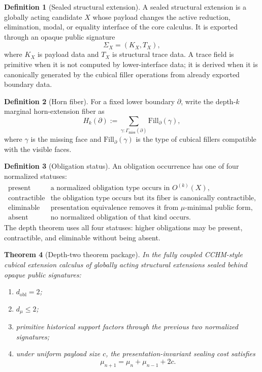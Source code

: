 \documentclass[11pt]{article}
\theoremstyle{plain}
\newtheorem{theorem}{Theorem}[section]
\theoremstyle{definition}
\newtheorem{definition}[theorem]{Definition}
\theoremstyle{remark}
\begin{document}
\begin{definition}[Sealed structural extension]
A sealed structural extension is a globally acting candidate \(X\) whose payload changes the active reduction, elimination, modal, or equality interface of the core calculus. It is exported through an opaque public signature
\[
\Sigma_X=(K_X,T_X),
\]
where \(K_X\) is payload data and \(T_X\) is structural trace data. A trace field is primitive when it is not computed by lower-interface data; it is derived when it is canonically generated by the cubical filler operations from already exported boundary data.
\end{definition}

\begin{definition}[Horn fiber]
For a fixed lower boundary \(\partial\), write the depth-\(k\) marginal horn-extension fiber as
\[
H_k(\partial)
:=
\sum_{\gamma:\Gamma_{\mathrm{miss}}(\partial)}
\mathrm{Fill}_{\partial}(\gamma),
\]
where \(\gamma\) is the missing face and \(\mathrm{Fill}_{\partial}(\gamma)\) is the type of cubical fillers compatible with the visible faces.
\end{definition}

\begin{definition}[Obligation status]
An obligation occurrence has one of four normalized statuses:
\[
\begin{array}{ll}
\mathrm{present} & \text{a normalized obligation type occurs in }O^{(k)}(X),\\
\mathrm{contractible} & \text{the obligation type occurs but its fiber is canonically contractible},\\
\mathrm{eliminable} & \text{presentation equivalence removes it from }\mu\text{-minimal public form},\\
\mathrm{absent} & \text{no normalized obligation of that kind occurs.}
\end{array}
\]
The depth theorem uses all four statuses: higher obligations may be present, contractible, and eliminable without being absent.
\end{definition}

\begin{theorem}[Depth-two theorem package]
In the fully coupled CCHM-style cubical extension calculus of globally acting structural extensions sealed behind opaque public signatures:
\begin{enumerate}[leftmargin=*]
\item \(d_{\mathrm{obl}}=2\);
\item \(d_\mu\le 2\);
\item primitive historical support factors through the previous two normalized signatures;
\item under uniform payload size \(c\), the presentation-invariant sealing cost satisfies
\[
\mu_{n+1}=\mu_n+\mu_{n-1}+2c.
\]
\end{enumerate}
\end{theorem}
\end{document}
